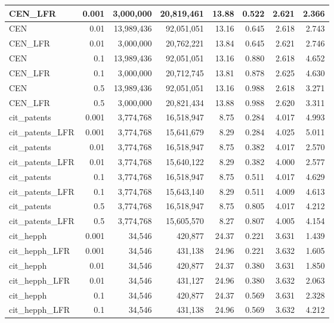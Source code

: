 \documentclass[a4paper]{article}   	%
\begin{document}
\begin{table}[h!]
\begin{tabular}{lrrrrrrr}
CEN\_LFR & 0.001 & 3,000,000  & 20,819,461 & 13.88    & 0.522 & 2.621 & 2.366 \\ \hline
CEN      & 0.01  & 13,989,436 & 92,051,051 & 13.16    & 0.645 & 2.618 & 2.743 \\
CEN\_LFR & 0.01  & 3,000,000  & 20,762,221 & 13.84    & 0.645 & 2.621 & 2.746 \\ \hline
CEN      & 0.1   & 13,989,436 & 92,051,051 & 13.16    & 0.880 & 2.618 & 4.652 \\
CEN\_LFR & 0.1   & 3,000,000  & 20,712,745 & 13.81    & 0.878 & 2.625 & 4.630 \\ \hline
CEN      & 0.5   & 13,989,436 & 92,051,051 & 13.16    & 0.988 & 2.618 & 3.271 \\
CEN\_LFR & 0.5   & 3,000,000  & 20,821,434 & 13.88    & 0.988 & 2.620 & 3.311 \\ \hline \hline
cit\_patents      & 0.001 & 3,774,768 & 16,518,947 & 8.75     & 0.284 & 4.017 & 4.993 \\
cit\_patents\_LFR & 0.001 & 3,774,768 & 15,641,679 & 8.29     & 0.284 & 4.025 & 5.011 \\ \hline
cit\_patents      & 0.01  & 3,774,768 & 16,518,947 & 8.75     & 0.382 & 4.017 & 2.570 \\
cit\_patents\_LFR & 0.01  & 3,774,768 & 15,640,122 & 8.29     & 0.382 & 4.000 & 2.577 \\ \hline
cit\_patents      & 0.1   & 3,774,768 & 16,518,947 & 8.75     & 0.511 & 4.017 & 4.629 \\
cit\_patents\_LFR & 0.1   & 3,774,768 & 15,643,140 & 8.29     & 0.511 & 4.009 & 4.613 \\ \hline
cit\_patents      & 0.5   & 3,774,768 & 16,518,947 & 8.75     & 0.805 & 4.017 & 4.212 \\
cit\_patents\_LFR & 0.5   & 3,774,768 & 15,605,570 & 8.27     & 0.807 & 4.005 & 4.154 \\ \hline \hline
cit\_hepph      & 0.001 & 34,546 & 420,877 & 24.37    & 0.221 & 3.631 & 1.439 \\
cit\_hepph\_LFR & 0.001 & 34,546 & 431,138 & 24.96    & 0.221 & 3.632 & 1.605 \\ \hline
cit\_hepph      & 0.01  & 34,546 & 420,877 & 24.37    & 0.380 & 3.631 & 1.850 \\
cit\_hepph\_LFR & 0.01  & 34,546 & 431,127 & 24.96    & 0.380 & 3.632 & 2.063 \\ \hline
cit\_hepph      & 0.1   & 34,546 & 420,877 & 24.37    & 0.569 & 3.631 & 2.328 \\
cit\_hepph\_LFR & 0.1   & 34,546 & 431,138 & 24.96    & 0.569 & 3.632 & 4.212 \\ \hline

\end{tabular}
\end{table}
\end{document}
